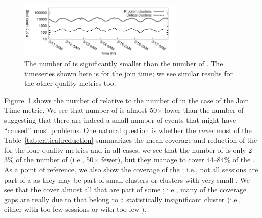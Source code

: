 \begin{figure}[t]
\centering
   \includegraphics[width=0.7\textwidth] {figures/conext13-time-cluster-count-join-time.pdf}
\caption{The number of \criticalclusters is significantly  
smaller than the number of \problemclusters. 
The timeseries shown here  is for the join time; we see 
similar  results for the other quality metrics too.}
\label{fig:critical:reduction}
\end{figure}


Figure~\ref{fig:critical:reduction} shows the number of 
\problemclusters relative to the number of \criticalclusters 
in the case of the Join Time metric. 
We see that  number of \criticalclusters is almost 
50$\times$ lower than the number of \problemclusters 
suggesting that there are indeed a small number of 
events that might have ``caused''  most  problems.  
One natural question is whether  the \criticalclusters 
\emph{cover} most of the \problemsessions. 
Table~\ref{tab:critical:reduction} summarizes the mean 
coverage and reduction  of the \criticalclusters for the four 
quality metrics and in all cases, we see that the number of 
\criticalclusters is only   2-3\% of the number of 
\problemclusters (i.e., 50$\times$ fewer), but they manage to
cover 44--84\% of the \problemsessions. 
As a point of reference,  we also show the coverage of 
the \problemclusters; i.e., not  all sessions are part of a 
\problemcluster as they may be part of  small clusters or 
clusters with very small \problemratio. 
We see that the \criticalclusters cover almost all 
\problemsessions that are part of some \problemcluster; 
i.e., many of the coverage  gaps are really due to 
\problemsessions that belong to a statistically insignificant 
cluster (i.e., either with too few sessions or with 
too few \problemsessions).
 
